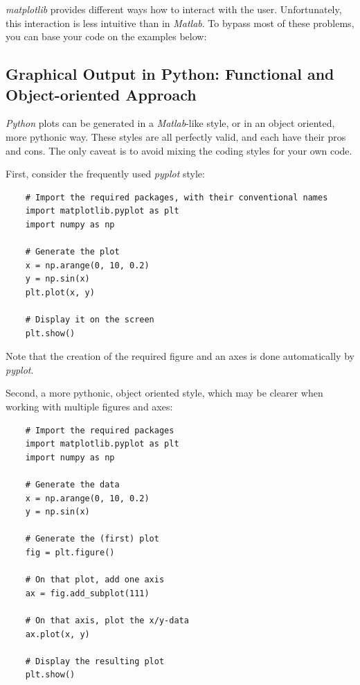 \emph{matplotlib} provides different ways how to interact with the user. Unfortunately, this interaction is less intuitive than in \emph{Matlab}. To bypass most of these problems, you can base your code on the examples below:




\subsection{Graphical Output in Python: Functional and Object-oriented Approach}

\emph{Python} plots can be generated in a \emph{Matlab}-like style, or in an object oriented, more pythonic way. These styles are all perfectly valid, and each have their pros and cons. The only caveat is to avoid mixing the coding styles for your own code.

First, consider the frequently used \emph{pyplot} style:

\begin{lstlisting}
    # Import the required packages, with their conventional names
    import matplotlib.pyplot as plt
    import numpy as np

    # Generate the plot
    x = np.arange(0, 10, 0.2)
    y = np.sin(x)
    plt.plot(x, y)

    # Display it on the screen
    plt.show()
\end{lstlisting}

Note that the creation of the required figure and an axes is done automatically by \emph{pyplot}.

Second, a more pythonic, object oriented style, which may be clearer when working with multiple figures and axes:

\begin{lstlisting}
    # Import the required packages
    import matplotlib.pyplot as plt
    import numpy as np

    # Generate the data
    x = np.arange(0, 10, 0.2)
    y = np.sin(x)

    # Generate the (first) plot
    fig = plt.figure()

    # On that plot, add one axis
    ax = fig.add_subplot(111)

    # On that axis, plot the x/y-data
    ax.plot(x, y)

    # Display the resulting plot
    plt.show()
\end{lstlisting}

